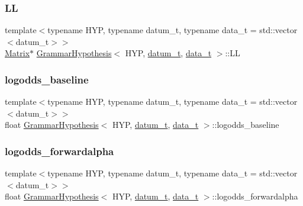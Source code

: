 \subsubsection{\texorpdfstring{LL}{LL}}
{\footnotesize\ttfamily template$<$typename H\+YP, typename datum\+\_\+t, typename data\+\_\+t = std\+::vector$<$datum\+\_\+t$>$$>$ \\
\hyperlink{_eigen_numerics_8h_a645222978e81acfb2523a9bce34aecc0}{Matrix}$\ast$ \hyperlink{class_grammar_hypothesis}{Grammar\+Hypothesis}$<$ H\+YP, \hyperlink{class_bayesable_a9f1a6c0cd7855550fa10b1a8f13a5867}{datum\+\_\+t}, \hyperlink{class_bayesable_aa2788c4d7718c0a824e1d28c4c98f921}{data\+\_\+t} $>$\+::LL}

\mbox{\label{class_grammar_hypothesis_a3a18c5d9774339cc2f5e202fd61b0c67}} 
\subsubsection{\texorpdfstring{logodds\+\_\+baseline}{logodds\_baseline}}
{\footnotesize\ttfamily template$<$typename H\+YP, typename datum\+\_\+t, typename data\+\_\+t = std\+::vector$<$datum\+\_\+t$>$$>$ \\
float \hyperlink{class_grammar_hypothesis}{Grammar\+Hypothesis}$<$ H\+YP, \hyperlink{class_bayesable_a9f1a6c0cd7855550fa10b1a8f13a5867}{datum\+\_\+t}, \hyperlink{class_bayesable_aa2788c4d7718c0a824e1d28c4c98f921}{data\+\_\+t} $>$\+::logodds\+\_\+baseline}

\mbox{\label{class_grammar_hypothesis_a06e85e0c1a7726714f7f06a4fc0a0618}} 
\subsubsection{\texorpdfstring{logodds\+\_\+forwardalpha}{logodds\_forwardalpha}}
{\footnotesize\ttfamily template$<$typename H\+YP, typename datum\+\_\+t, typename data\+\_\+t = std\+::vector$<$datum\+\_\+t$>$$>$ \\
float \hyperlink{class_grammar_hypothesis}{Grammar\+Hypothesis}$<$ H\+YP, \hyperlink{class_bayesable_a9f1a6c0cd7855550fa10b1a8f13a5867}{datum\+\_\+t}, \hyperlink{class_bayesable_aa2788c4d7718c0a824e1d28c4c98f921}{data\+\_\+t} $>$\+::logodds\+\_\+forwardalpha}

